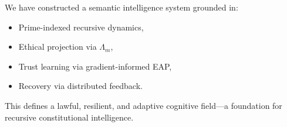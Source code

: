 \documentclass[11pt]{article}
\begin{document}
We have constructed a semantic intelligence system grounded in:

\begin{itemize}
  \item Prime-indexed recursive dynamics,
  \item Ethical projection via $\Lambda_m$,
  \item Trust learning via gradient-informed EAP,
  \item Recovery via distributed feedback.
\end{itemize}

This defines a lawful, resilient, and adaptive cognitive field—a foundation for recursive constitutional intelligence.

\nocite{*}


\end{document}
